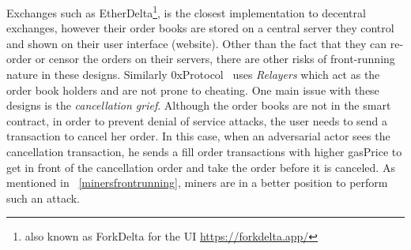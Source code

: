

Exchanges such as EtherDelta\footnote{also known as ForkDelta for the UI \url{https://forkdelta.app/}}, is the closest implementation to decentral exchanges, however their order books are stored on a central server they control and shown on their user interface (website). Other than the fact that they can re-order or censor the orders on their servers, there are other risks of front-running nature in these designs. Similarly 0xProtocol~\cite{warren20170x} uses \textit{Relayers} which act as the order book holders and are not prone to cheating. One main issue with these designs is the \textit{cancellation grief}. Although the order books are not in the smart contract, in order to prevent denial of service attacks, the user needs to send a transaction to cancel her order. In this case, when an adversarial actor sees the cancellation transaction, he sends a fill order transactions with higher gasPrice to get in front of the cancellation order and take the order before it is canceled. As mentioned in ~\ref{minersfrontrunning}, miners are in a better position to perform such an attack. 


